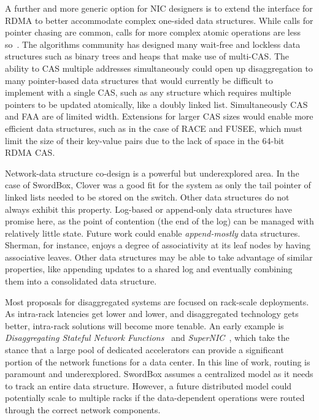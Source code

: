 \documentclass[12pt]{ucsddissertation}
\newcommand{\sword}{SwordBox}
\begin{document}
A further and more generic option for NIC designers is to extend the interface for RDMA to better
accommodate complex one-sided data structures. While calls for pointer chasing are common, calls for
more complex atomic operations are less so~\cite{prism, clio}. The algorithms community has designed
many wait-free and lockless data structures such as binary trees and heaps that make use of
multi-CAS. The ability to CAS multiple addresses simultaneously could open up disaggregation to many
pointer-based data structures that would currently be difficult to implement with a single CAS, such
as any structure which requires multiple pointers to be updated atomically, like a doubly linked
list. Simultaneously CAS and FAA are of limited width. Extensions for larger CAS sizes would enable
more efficient data structures, such as in the case of RACE and FUSEE, which must limit the size of
their key-value pairs due to the lack of space in the 64-bit RDMA CAS.

Network-data structure co-design is a powerful but underexplored area. In the case of
{\sword}, Clover was a good fit for the system as only the tail pointer of linked lists needed
to be stored on the switch. Other data structures do not always exhibit this property. Log-based or
append-only data structures have promise here, as the point of contention (the end of the log) can
be managed with relatively little state. Future work could enable \textit{append-mostly} data
structures. Sherman, for instance, enjoys a degree of associativity at its leaf nodes by having
associative leaves. Other data structures may be able to take advantage of similar properties, like
appending updates to a shared log and eventually combining them into a consolidated data structure.

Most proposals for disaggregated systems are focused on rack-scale deployments. As intra-rack
latencies get lower and lower, and disaggregated technology gets better, intra-rack solutions will
become more tenable. An early example is \textit{Disaggregating Stateful Network
Functions}~\cite{dsnf} and \textit{SuperNIC}~\cite{supernic}, which take the stance that a large
pool of dedicated accelerators can provide a significant portion of the network functions for a data
center. In this line of work, routing is paramount and underexplored. {\sword} assumes a
centralized model as it needs to track an entire data structure. However, a future distributed model
could potentially scale to multiple racks if the data-dependent operations were routed through the
correct network components.
\end{document}
